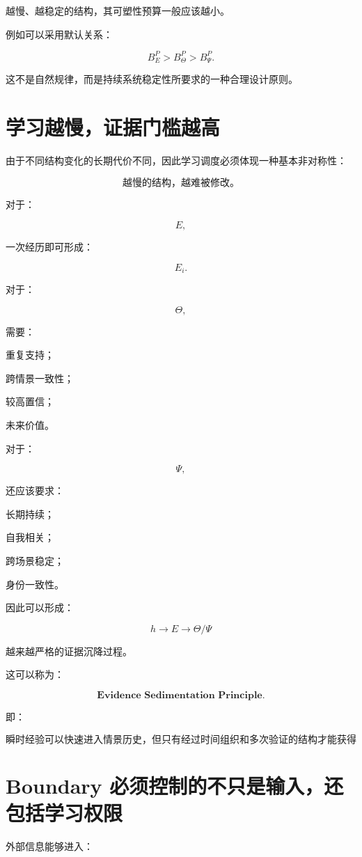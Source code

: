 越慢、越稳定的结构，其可塑性预算一般应该越小。

例如可以采用默认关系：

\[
\boxed{
B_E^P
>
B_{\Theta}^P
>
B_{\Psi}^P.
}
\]

这不是自然规律，而是持续系统稳定性所要求的一种合理设计原则。


\section{学习越慢，证据门槛越高}

由于不同结构变化的长期代价不同，因此学习调度必须体现一种基本非对称性：

\[
\boxed{
\text{越慢的结构，越难被修改。}
}
\]

对于：

\[
E,
\]

一次经历即可形成：

\[
E_i.
\]

对于：

\[
\Theta,
\]

需要：

重复支持；

跨情景一致性；

较高置信；

未来价值。

对于：

\[
\Psi,
\]

还应该要求：

长期持续；

自我相关；

跨场景稳定；

身份一致性。

因此可以形成：

\[
\boxed{
h
\rightarrow
E
\rightarrow
\Theta/\Psi
}
\]

越来越严格的证据沉降过程。

这可以称为：

\[
\boxed{
\textbf{Evidence Sedimentation Principle}.
}
\]

即：

\[
\boxed{
\textbf{
瞬时经验可以快速进入情景历史，但只有经过时间组织和多次验证的结构才能获得慢结构修改权。
}
}
\]


\section{Boundary 必须控制的不只是输入，还包括学习权限}

外部信息能够进入：

